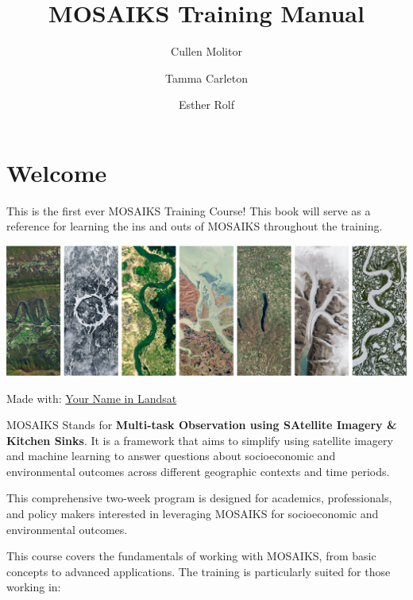 \documentclass[
  letterpaper,
  DIV=11,
  numbers=noendperiod]{scrreprt}
\title{MOSAIKS Training Manual}
\author{Cullen Molitor \and Tamma Carleton \and Esther Rolf}
\date{}
\renewcommand*\contentsname{Table of contents}
\newcommand\contentsname{Table of contents}
\begin{document}
\maketitle
\ifdefined\Shaded\renewenvironment{Shaded}{\begin{tcolorbox}[sharp corners, enhanced, boxrule=0pt, breakable, interior hidden, borderline west={3pt}{0pt}{shadecolor}, frame hidden]}{\end{tcolorbox}}\fi

\renewcommand*\contentsname{Table of contents}
{
\hypersetup{linkcolor=}
\setcounter{tocdepth}{2}
\tableofcontents
}

\hypertarget{welcome}{%
\chapter*{Welcome}\label{welcome}}


This is the first ever MOSAIKS Training Course! This book will serve as
a reference for learning the ins and outs of MOSAIKS throughout the
training.

\includegraphics{images/mosaiks-in-landsat.png}

Made with:
\href{https://landsat.gsfc.nasa.gov/apps/YourNameInLandsat-main/}{Your
Name in Landsat}

MOSAIKS Stands for \textbf{Multi-task Observation using SAtellite
Imagery \& Kitchen Sinks}. It is a framework that aims to simplify using
satellite imagery and machine learning to answer questions about
socioeconomic and environmental outcomes across different geographic
contexts and time periods.

This comprehensive two-week program is designed for academics,
professionals, and policy makers interested in leveraging MOSAIKS for
socioeconomic and environmental outcomes.

This course covers the fundamentals of working with MOSAIKS, from basic
concepts to advanced applications. The training is particularly suited
for those working in:
\end{document}
